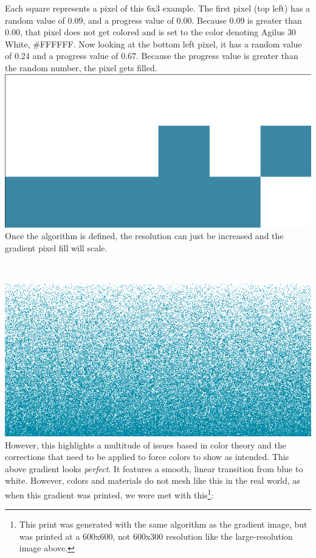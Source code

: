 \documentclass{article}
\begin{document}
\begin{multicols}{2}
\noindent
Each square represents a pixel of this 6x3 example. The first pixel (top left) has a random value of 0.09, and a progress value of 0.00. Because 0.09 is greater than 0.00, that pixel does not get colored and is set to the color denoting Agilus 30 White, \#FFFFFF. Now looking at the bottom left pixel, it has a random value of 0.24 and a progress value of 0.67. Because the progress value is greater than the random number, the pixel gets filled.
\\

\noindent
\includegraphics[width=\columnwidth]{slice_000_scaled}
\\

\noindent
Once the algorithm is defined, the resolution can just be increased and the gradient pixel fill will scale.

\

\noindent
\includegraphics[width=\columnwidth]{slice_000}
\\

\noindent
However, this highlights a multitude of issues based in color theory and the corrections that need to be applied to force colors to show as intended. This above gradient looks \textit{perfect}. It features a smooth, linear transition from blue to white. However, colors and materials do not mesh like this in the real world, as when this gradient was printed, we were met with this\footnote{This print was generated with the same algorithm as the gradient image, but was printed at a 600x600, not 600x300 resolution like the large-resolution image above.}:
\\


\end{multicols}
\end{document}
